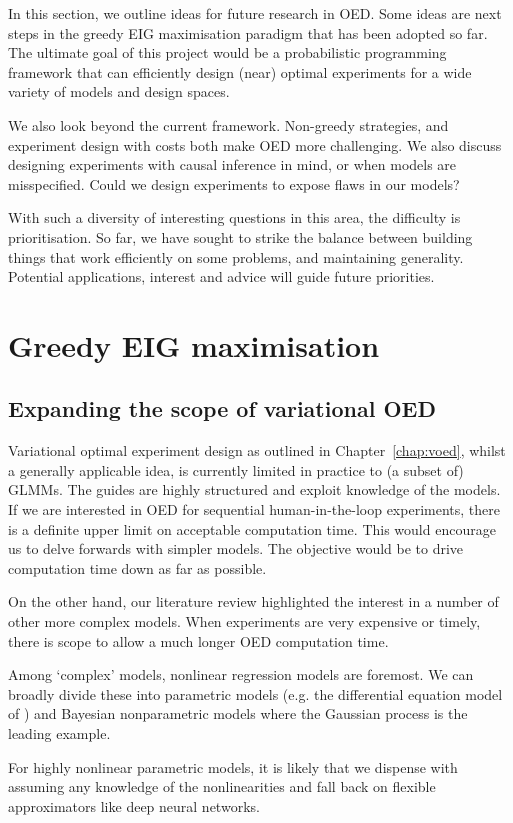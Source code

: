 In this section, we outline ideas for future research in OED. Some ideas are next steps in the greedy EIG maximisation paradigm that has been adopted so far. The ultimate goal of this project would be a probabilistic programming framework that can efficiently design (near) optimal experiments for a wide variety of models and design spaces.

We also look beyond the current framework. Non-greedy strategies, and experiment design with costs both make OED more challenging. We also discuss designing experiments with causal inference in mind, or when models are misspecified. Could we design experiments to expose flaws in our models?

With such a diversity of interesting questions in this area, the difficulty is prioritisation. So far, we have sought to strike the balance between building things that work efficiently on some problems, and maintaining generality. Potential applications, interest and advice will guide future priorities.


\section{Greedy EIG maximisation}
\subsection{Expanding the scope of variational OED}
Variational optimal experiment design as outlined in Chapter~\ref{chap:voed}, whilst a generally applicable idea, is currently limited in practice to (a subset of) GLMMs. The guides are highly structured and exploit knowledge of the models. If we are interested in OED for sequential human-in-the-loop experiments, there is a definite upper limit on acceptable computation time. This would encourage us to delve forwards with simpler models. The objective would be to drive computation time down as far as possible.

On the other hand, our literature review highlighted the interest in a number of other more complex models. When experiments are very expensive or timely, there is scope to allow a much longer OED computation time.

Among `complex' models, nonlinear regression models are foremost. We can broadly divide these into parametric models (e.g. the differential equation model of \cite{vanlier2012}) and Bayesian nonparametric models where the Gaussian process is the leading example. 

For highly nonlinear parametric models, it is likely that we dispense with assuming any knowledge of the nonlinearities and fall back on flexible approximators like deep neural networks.

